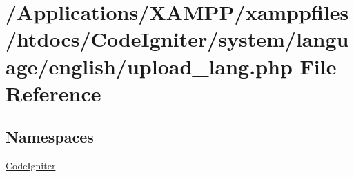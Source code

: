 \hypertarget{upload__lang_8php}{}\section{/\+Applications/\+X\+A\+M\+P\+P/xamppfiles/htdocs/\+Code\+Igniter/system/language/english/upload\+\_\+lang.php File Reference}
\label{upload__lang_8php}
\subsection*{Namespaces}
\begin{DoxyCompactItemize}
\item 
 \mbox{\hyperlink{namespace_code_igniter}{Code\+Igniter}}
\end{DoxyCompactItemize}
